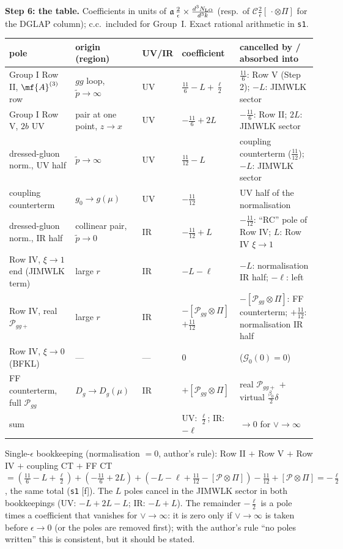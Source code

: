 \medskip
\noindent\textbf{Step 6: the table.} Coefficients in units of $\mathfrak{a}\,\frac{2}{\epsilon}\times\frac{d^{3}N_{\rm LO}}{d^{3}k}$ (resp.\ of $\mathcal{C}\frac{2}{\epsilon}[\,\cdot\otimes\Pi]$ for the DGLAP column); c.c.\ included for Group~I. Exact rational arithmetic in \texttt{s1}.
\begin{center}
\renewcommand{\arraystretch}{1.3}
\begin{tabular}{|p{4.3cm}|p{4.2cm}|p{1.1cm}|p{2.6cm}|p{4.9cm}|}\hline
pole & origin (region) & UV/IR & coefficient & cancelled by / absorbed into\\\hline
Group I Row II, $\mf{A}^{(3)}$ row & $gg$ loop, $\tilde p\to\infty$ & UV & $\frac{11}{6}-L+\frac{\ell}{2}$ & $\frac{11}{6}$: Row V (Step 2); $-L$: JIMWLK sector\\
Group I Row V, $2b$ UV & pair at one point, $z\to x$ & UV & $-\frac{11}{6}+2L$ & $-\frac{11}{6}$: Row II; $2L$: JIMWLK sector\\
dressed-gluon norm., UV half & $\tilde p\to\infty$ & UV & $\frac{11}{12}-L$ & coupling counterterm ($\frac{11}{12}$); $-L$: JIMWLK sector\\
coupling counterterm & $g_{0}\to g(\mu)$ & UV & $-\frac{11}{12}$ & UV half of the normalisation\\\hline
dressed-gluon norm., IR half & collinear pair, $\tilde p\to0$ & IR & $-\frac{11}{12}+L$ & $-\frac{11}{12}$: ``RC'' pole of Row IV; $L$: Row IV $\xi\to1$\\
Row IV, $\xi\to1$ end (JIMWLK term) & large $r$ & IR & $-L-\ell$ & $-L$: normalisation IR half; $-\ell$: left\\
Row IV, real $\mathcal{P}_{gg+}$ & large $r$ & IR & $-[\mathcal{P}_{gg}\otimes\Pi]$ $+\frac{11}{12}$ & $-[\mathcal{P}_{gg}\otimes\Pi]$: FF counterterm; $+\frac{11}{12}$: normalisation IR half\\
Row IV, $\xi\to0$ (BFKL) & --- & --- & $0$ & ($\mathcal{G}_{0}(0)=0$)\\
FF counterterm, full $\mathcal{P}_{gg}$ & $D_{g}\to D_{g}(\mu)$ & IR & $+[\mathcal{P}_{gg}\otimes\Pi]$ & real $\mathcal{P}_{gg+}$ $+$ virtual $\frac{\beta_{0}}{2}\delta$\\\hline
sum & & & UV: $\frac{\ell}{2}$; IR: $-\ell$ & $\to0$ for $\vee\to\infty$\\\hline
\end{tabular}
\end{center}
\noindent Single-$\epsilon$ bookkeeping (normalisation $=0$, author's rule): Row II $+$ Row V $+$ Row IV $+$ coupling CT $+$ FF CT $=(\frac{11}{6}-L+\frac{\ell}{2})+(-\frac{11}{6}+2L)+(-L-\ell+\frac{11}{12}-[\mathcal{P}\otimes\Pi])-\frac{11}{12}+[\mathcal{P}\otimes\Pi]=-\frac{\ell}{2}$, the same total (\texttt{s1} [f]). The $L$ poles cancel in the JIMWLK sector in both bookkeepings (UV: $-L+2L-L$; IR: $-L+L$). The remainder $-\frac{\ell}{2}$ is a pole times a coefficient that vanishes for $\vee\to\infty$: it is zero only if $\vee\to\infty$ is taken before $\epsilon\to0$ (or the poles are removed first); with the author's rule ``no poles written'' this is consistent, but it should be stated.

